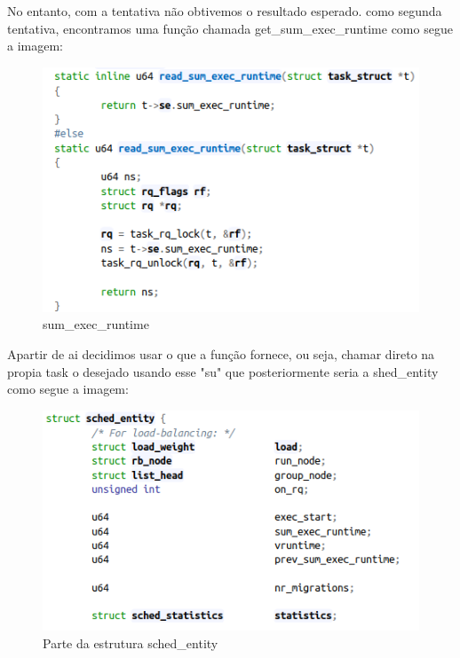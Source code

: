 \documentclass[12pt]{article}
\begin{document}
	No entanto, com a tentativa não obtivemos o resultado esperado.
como segunda tentativa, encontramos uma função chamada get\_sum\_exec\_runtime como segue a imagem:

\vspace*{0.2cm}
\begin{figure}[!h]
	\centering
\includegraphics[scale=0.5]{imagens/sum_e.png} 
	\caption{sum\_exec\_runtime}
	\label{decschedentity}
\end{figure}
\vspace*{0.2cm}

 Apartir de ai decidimos usar o que a função fornece, ou seja, chamar direto na propia task o desejado usando esse "su" que posteriormente seria a shed\_entity como segue a imagem:
 
\vspace*{0.2cm}
\begin{figure}[!h]
	\centering
	\includegraphics[scale=0.4]{imagens/img2.png}
	\caption{Parte da estrutura sched\_entity}
	\label{schedentity}
\end{figure}
\vspace*{0.2cm}
\end{document}
